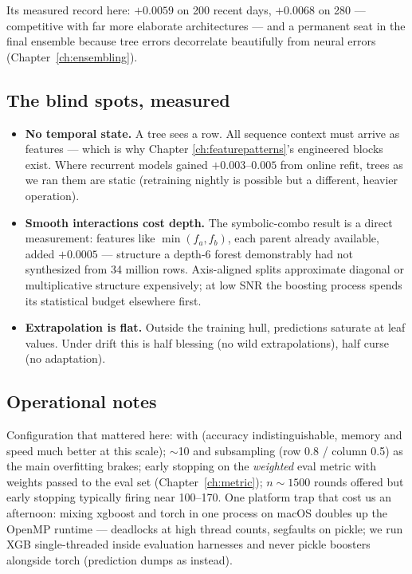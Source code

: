 Its measured record here: $+0.0059$ on 200 recent days, $+0.0068$ on 280
--- competitive with far more elaborate architectures --- and a permanent
seat in the final ensemble because tree errors decorrelate beautifully
from neural errors (Chapter~\ref{ch:ensembling}).

\subsection{The blind spots, measured}

\begin{itemize}
\item \textbf{No temporal state.} A tree sees a row. All sequence context
  must arrive as features --- which is why Chapter
  \ref{ch:featurepatterns}'s engineered blocks exist. Where recurrent
  models gained $+0.003$--$0.005$ from online refit, trees as we ran them
  are static (retraining nightly is possible but a different, heavier
  operation).
\item \textbf{Smooth interactions cost depth.} The symbolic-combo result
  is a direct measurement: features like $\min(f_a, f_b)$, each parent
  already available, added $+0.0005$ --- structure a depth-6 forest
  demonstrably had not synthesized from 34 million rows. Axis-aligned
  splits approximate diagonal or multiplicative structure expensively;
  at low SNR the boosting process spends its statistical budget elsewhere
  first.
\item \textbf{Extrapolation is flat.} Outside the training hull,
  predictions saturate at leaf values. Under drift this is half blessing
  (no wild extrapolations), half curse (no adaptation).
\end{itemize}

\subsection{Operational notes}

Configuration that mattered here:  with
 (accuracy indistinguishable, memory and speed much
better at this scale);  $\sim$10 and subsampling
(row 0.8 / column 0.5) as the main overfitting brakes; early stopping on
the \emph{weighted} eval metric with weights passed to the eval set
(Chapter~\ref{ch:metric}); $n \sim 1500$ rounds offered but early stopping
typically firing near 100--170. One platform trap that cost us an
afternoon: mixing xgboost and torch in one process on macOS doubles up the
OpenMP runtime --- deadlocks at high thread counts, segfaults on pickle;
we run XGB single-threaded inside evaluation harnesses and never pickle
boosters alongside torch (prediction dumps as  instead).

